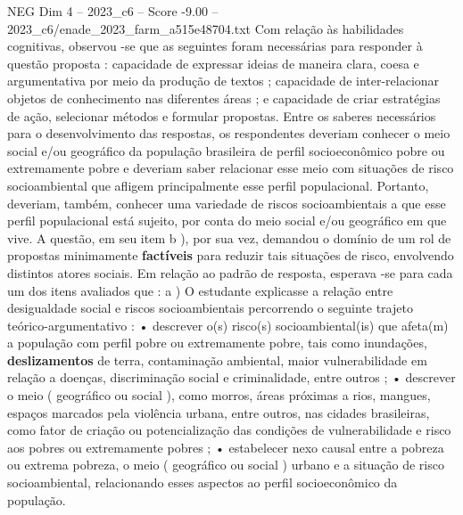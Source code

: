\begin{textsample}{NEG Dim 4 – 2023\_c6 – Score -9.00 – 2023\_c6/enade\_2023\_farm\_a515e48704.txt}
Com relação às habilidades cognitivas, observou -se que as seguintes foram necessárias para responder à questão proposta : capacidade de expressar ideias de maneira clara, coesa e argumentativa por meio da produção de textos ; capacidade de inter-relacionar objetos de conhecimento nas diferentes áreas ; e capacidade de criar estratégias de ação, selecionar métodos e formular propostas.
Entre os saberes necessários para o desenvolvimento das respostas, os respondentes deveriam conhecer o meio social e/ou geográfico da população brasileira de perfil socioeconômico pobre ou extremamente pobre e deveriam saber relacionar esse meio com situações de risco socioambiental que afligem principalmente esse perfil populacional.
Portanto, deveriam, também, conhecer uma variedade de riscos socioambientais a que esse perfil populacional está sujeito, por conta do meio social e/ou geográfico em que vive.
A questão, em seu item b ), por sua vez, demandou o domínio de um rol de propostas minimamente \textbf{factíveis} para reduzir tais situações de risco, envolvendo distintos atores sociais.
Em relação ao padrão de resposta, esperava -se para cada um dos itens avaliados que : a ) O estudante explicasse a relação entre desigualdade social e riscos socioambientais percorrendo o seguinte trajeto teórico-argumentativo : • descrever o(s) risco(s) socioambiental(is) que afeta(m) a população com perfil pobre ou extremamente pobre, tais como inundações, \textbf{deslizamentos} de terra, contaminação ambiental, maior vulnerabilidade em relação a doenças, discriminação social e criminalidade, entre outros ; • descrever o meio ( geográfico ou social ), como morros, áreas próximas a rios, mangues, espaços marcados pela violência urbana, entre outros, nas cidades brasileiras, como fator de criação ou potencialização das condições de vulnerabilidade e risco aos pobres ou extremamente pobres ; • estabelecer nexo causal entre a pobreza ou extrema pobreza, o meio ( geográfico ou social ) urbano e a situação de risco socioambiental, relacionando esses aspectos ao perfil socioeconômico da população.

\end{textsample}
